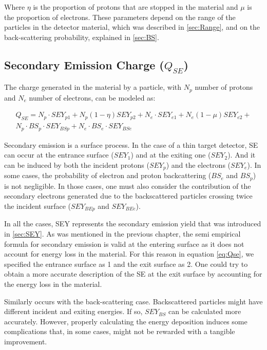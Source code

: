 Where $\eta$ is the proportion of protons that are stopped in the material and $\mu$ is the proportion of electrons. These parameters depend on the range of the particles in the detector material, which was described in \ref{sec:Range}, and on the back-scattering probability, explained in \ref{sec:BS}. 

\subsection{Secondary Emission Charge ($Q_{SE}$)} 

The charge generated in the material by a particle, with $N_p$ number of protons and $N_e$ number of electrons, can be modeled as: 

\begin{equation}
    \begin{split}
        Q_{SE} = N_p \cdot SEY_{p1} + N_p \left(1-\eta\right)SEY_{p2} + 
                N_e \cdot SEY_{e1} + N_e \left( 1 - \mu \right) SEY_{e2} + \\
                N_p \cdot BS_p \cdot SEY_{BSp} + N_e \cdot BS_e \cdot SEY_{BSe}
    \end{split}
    \label{eq:Qse}
\end{equation}

Secondary emission is a surface process. In the case of a thin target detector, SE can occur at the entrance surface ($SEY_1$) and at the exiting one ($SEY_2$). And it can be induced by both the incident protons ($SEY_p$) and the electrons ($SEY_e$). In some cases, the probability of electron and proton backcattering ($BS_e$ and $BS_p$) is not negligible. In those cases, one must also consider the contribution of the secondary electrons generated due to the backscattered particles crossing twice the incident surface ($SEY_{BEp}$ and $SEY_{BEe}$).

In all the cases, SEY represents the secondary emission yield that was introduced in \ref{sec:SEY}. As was mentioned in the previous chapter, the semi empirical formula for secondary emission is valid at the entering surface as it does not account for energy loss in the material. For this reason in equation \ref{eq:Qse}, we specified the entrance surface as 1 and the exit surface as 2. One could try to obtain a more accurate description of the SE at the exit surface by accounting for the energy loss in the material. 

Similarly occurs with the back-scattering case. Backscattered particles might have different incident and exiting energies. If so,  $SEY_{BS}$ can be calculated more accurately. However, properly calculating the energy deposition induces some complications that, in some cases, might not be rewarded with a tangible improvement. 

